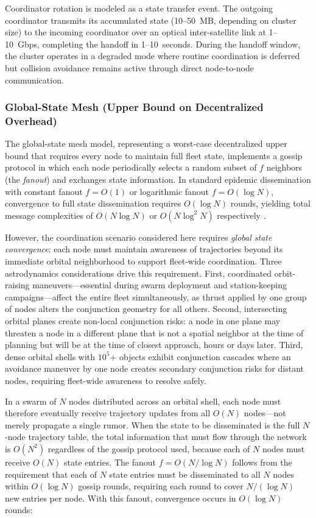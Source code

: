 \documentclass[journal]{IEEEtran}
\begin{document}
Coordinator rotation is modeled as a state transfer event. The outgoing coordinator transmits its accumulated state (10--50~MB, depending on cluster size) to the incoming coordinator over an optical inter-satellite link at 1--10~Gbps, completing the handoff in 1--10~seconds. During the handoff window, the cluster operates in a degraded mode where routine coordination is deferred but collision avoidance remains active through direct node-to-node communication.

\subsubsection{Global-State Mesh (Upper Bound on Decentralized Overhead)}

The global-state mesh model, representing a worst-case decentralized upper bound that requires every node to maintain full fleet state, implements a gossip protocol in which each node periodically selects a random subset of $f$ neighbors (the \emph{fanout}) and exchanges state information. In standard epidemic dissemination with constant fanout $f = O(1)$ or logarithmic fanout $f = O(\log N)$, convergence to full state dissemination requires $O(\log N)$ rounds, yielding total message complexities of $O(N \log N)$ or $O(N \log^2 N)$ respectively \cite{demers_gossip}.

However, the coordination scenario considered here requires \emph{global state convergence}: each node must maintain awareness of trajectories beyond its immediate orbital neighborhood to support fleet-wide coordination. Three astrodynamics considerations drive this requirement. First, coordinated orbit-raising maneuvers---essential during swarm deployment and station-keeping campaigns---affect the entire fleet simultaneously, as thrust applied by one group of nodes alters the conjunction geometry for all others. Second, intersecting orbital planes create non-local conjunction risks: a node in one plane may threaten a node in a different plane that is not a spatial neighbor at the time of planning but will be at the time of closest approach, hours or days later. Third, dense orbital shells with $10^5$+ objects exhibit conjunction cascades where an avoidance maneuver by one node creates secondary conjunction risks for distant nodes, requiring fleet-wide awareness to resolve safely.

In a swarm of $N$ nodes distributed across an orbital shell, each node must therefore eventually receive trajectory updates from all $O(N)$ nodes---not merely propagate a single rumor. When the state to be disseminated is the full $N$-node trajectory table, the total information that must flow through the network is $O(N^2)$ regardless of the gossip protocol used, because each of $N$ nodes must receive $O(N)$ state entries. The fanout $f = O(N / \log N)$ follows from the requirement that each of $N$ state entries must be disseminated to all $N$ nodes within $O(\log N)$ gossip rounds, requiring each round to cover $N / (\log N)$ new entries per node. With this fanout, convergence occurs in $O(\log N)$ rounds:
\end{document}
